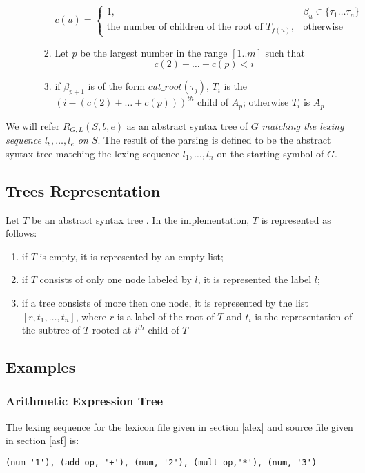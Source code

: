 \documentclass[a4paper,10pt]{article}
\begin{document}
\begin{enumerate}
\begin{itemize}
\begin{enumerate}
\[
c(u) = 
\begin{cases}
             1,& \beta_u \in \{\tau_1 \dots \tau_n\} \\
  \text{the number of children of the root of } T_{f(u)},          & \text{otherwise}
\end{cases}
\]
\item Let $p$ be the largest number in the range $[1..m]$ such that $$c(2) + \ldots + c(p) < i$$
\item if $\beta_{p+1}$ is of the form $cut\_root(\tau_j)$, $T_i$ is the $(i - (c(2) + \ldots + c(p)))^{th}$ child of $A_p$;
      otherwise $T_i$ is $A_p$

 \end{enumerate}
 \end{itemize}
 \end{enumerate}

We will refer  $R_{G,L}(S,b,e)$ as  an abstract syntax tree of $G$ \textit{matching the lexing sequence $l_b, \ldots, l_e$ on $S$}. 
The result of the parsing is defined to be the abstract syntax tree matching the lexing sequence $l_1, \ldots, l_n$ on the starting symbol of $G$.  


\subsection{Trees Representation}\label{treesec}
Let $T$ be an abstract syntax tree .
In the implementation, $T$ is  represented as follows:
\begin{enumerate}
\item if $T$ is empty, it is represented by an empty list;
\item if $T$ consists of only one node labeled by $l$, it is represented the label $l$;
\item if a tree consists of more then one node, it is represented by the list $[r,t_1,\ldots,t_n]$, where $r$ is a label of the root of $T$ and  $t_i$ is the representation of the subtree of $T$ rooted at $i^{th}$ child of $T$ 
\end{enumerate}

\subsection{Examples}
\subsubsection{Arithmetic Expression Tree}

The lexing sequence for the  lexicon file given in section \ref{alex} and source file given in section \ref{asf} is:
\begin{verbatim}
(num '1'), (add_op, '+'), (num, '2'), (mult_op,'*'), (num, '3') 
\end{verbatim}
\end{document}
